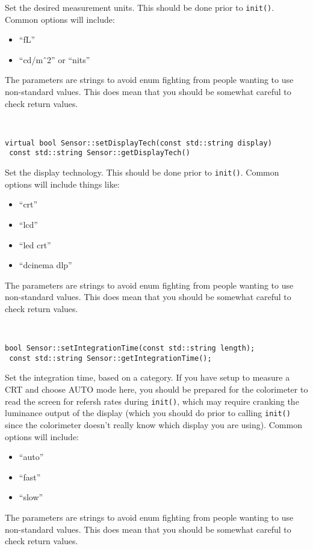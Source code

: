 \begin{description}
Set the desired measurement units. This should be done prior
to {\tt init()}. Common options will include:
\begin{itemize}
     \item ``fL''              
     \item ``cd/m\^\ 2'' or ``nits''
\end{itemize}

The parameters are strings to 
avoid enum fighting from people wanting to use non-standard values.
This does mean that you should be somewhat careful to check 
return values.

\item[] \
\begin{lstlisting}[frame=single]
 virtual bool Sensor::setDisplayTech(const std::string display)
 const std::string Sensor::getDisplayTech()
\end{lstlisting}

Set the display technology. This should be done prior to
{\tt init()}. Common options will include things like:
\begin{itemize}
    \item ``crt''
    \item ``lcd''
    \item ``led crt''
    \item ``dcinema dlp''
\end{itemize}

The parameters are strings to 
avoid enum fighting from people wanting to use non-standard values.
This does mean that you should be somewhat careful to check 
return values.

\item[] \
\begin{lstlisting}[frame=single]
 bool Sensor::setIntegrationTime(const std::string length);
 const std::string Sensor::getIntegrationTime();
\end{lstlisting}

Set the integration time, based on a category. If you have
setup to measure a CRT and choose AUTO mode here, you should
be prepared for the colorimeter to read the screen for
refersh rates during {\tt init()}, which may require cranking 
the luminance output of the display (which you should do
prior to calling {\tt init()} since the colorimeter doesn't really
know which display you are using).
Common options will include:
\begin{itemize}
    \item ``auto''
    \item ``fast''
    \item ``slow''
\end{itemize}

The parameters are strings to 
avoid enum fighting from people wanting to use non-standard values.
This does mean that you should be somewhat careful to check 
return values.

\end{description}






